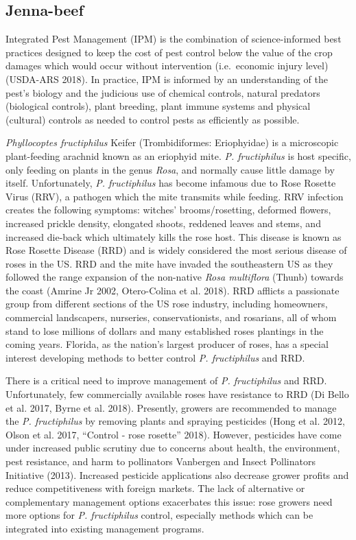 \documentclass[12pt,final,CPage]{ufthesis}
\begin{document}
{{  \subsection{Jenna-beef}\label{jenna-beef}}

  Integrated Pest Management (IPM) is the combination of science-informed best practices designed to keep the cost of pest control below the value of the crop damages which would occur without intervention (i.e.~economic injury level) (USDA-ARS 2018). In practice, IPM is informed by an understanding of the pest's biology and the judicious use of chemical controls, natural predators (biological controls), plant breeding, plant immune systems and physical (cultural) controls as needed to control pests as efficiently as possible.

  \emph{Phyllocoptes fructiphilus} Keifer (Trombidiformes: Eriophyidae) is a microscopic plant-feeding arachnid known as an eriophyid mite. \emph{P. fructiphilus} is host specific, only feeding on plants in the genus \emph{Rosa}, and normally cause little damage by itself. Unfortunately, \emph{P. fructiphilus} has become infamous due to Rose Rosette Virus (RRV), a pathogen which the mite transmits while feeding. RRV infection creates the following symptoms: witches' brooms/rosetting, deformed flowers, increased prickle density, elongated shoots, reddened leaves and stems, and increased die-back which ultimately kills the rose host. This disease is known as Rose Rosette Disease (RRD) and is widely considered the most serious disease of roses in the US. RRD and the mite have invaded the southeastern US as they followed the range expansion of the non-native \emph{Rosa multiflora} (Thunb) towards the coast (Amrine Jr 2002, Otero-Colina et al. 2018). RRD afflicts a passionate group from different sections of the US rose industry, including homeowners, commercial landscapers, nurseries, conservationists, and rosarians, all of whom stand to lose millions of dollars and many established roses plantings in the coming years. Florida, as the nation's largest producer of roses, has a special interest developing methods to better control \emph{P. fructiphilus} and RRD.

  There is a critical need to improve management of \emph{P. fructiphilus} and RRD. Unfortunately, few commercially available roses have resistance to RRD (Di Bello et al. 2017, Byrne et al. 2018). Presently, growers are recommended to manage the \emph{P. fructiphilus} by removing plants and spraying pesticides (Hong et al. 2012, Olson et al. 2017, {``Control - rose rosette''} 2018). However, pesticides have come under increased public scrutiny due to concerns about health, the environment, pest resistance, and harm to pollinators Vanbergen and Insect Pollinators Initiative (2013). Increased pesticide applications also decrease grower profits and reduce competitiveness with foreign markets. The lack of alternative or complementary management options exacerbates this issue: rose growers need more options for \emph{P. fructiphilus} control, especially methods which can be integrated into existing management programs.

}
\end{document}
